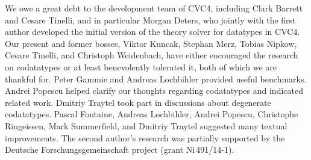 
{\footnotesize
\def\ackname{Acknowledgment}
\ourparagraph{\footnotesize\ackname.}
We owe a great debt to the development team of CVC4,
including Clark Barrett and Cesare Tinelli,
and in particular Morgan Deters,
who jointly with the first author
developed the initial version
of the theory solver for datatypes in CVC4.
%
Our present and former bosses, Viktor Kuncak, Stephan Merz, Tobias Nipkow,
Cesare Tinelli, and Christoph Weidenbach, have either encouraged the research on
codatatypes or at least benevolently tolerated it, both of which we are thankful
for.
%
Peter Gammie and Andreas Lochbihler provided useful benchmarks.
Andrei Popescu helped clarify our thoughts regarding codatatypes and indicated
related work. Dmitriy Traytel took part in discussions about degenerate
codatatypes.
%
Pascal Fontaine, Andreas Lochbihler, Andrei Popescu, Christophe Ringeissen, Mark
Summerfield, and Dmitriy Traytel suggested many textual improvements.
The second author's
research was partially supported by the Deutsche
Forschungs\-gemein\-schaft %
project  (grant Ni\,491\slash 14-1).

}


{}


